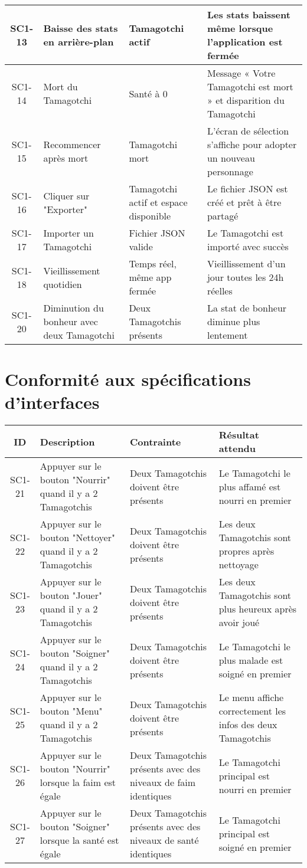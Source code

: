 \documentclass{cahier_de_recette}
\begin{document}
\begin{longtable}{|c|p{4cm}|p{4cm}|p{4cm}|}
\hline
SC1-13 & Baisse des stats en arrière-plan & Tamagotchi actif & Les stats baissent même lorsque l'application est fermée \\
\hline
SC1-14 & Mort du Tamagotchi & Santé à 0 & Message « Votre Tamagotchi est mort » et disparition du Tamagotchi \\
\hline
SC1-15 & Recommencer après mort & Tamagotchi mort & L’écran de sélection s’affiche pour adopter un nouveau personnage \\
\hline
SC1-16 & Cliquer sur "Exporter" & Tamagotchi actif et espace disponible & Le fichier JSON est créé et prêt à être partagé \\
\hline
SC1-17 & Importer un Tamagotchi & Fichier JSON valide & Le Tamagotchi est importé avec succès \\
\hline
SC1-18 & Vieillissement quotidien & Temps réel, même app fermée & Vieillissement d'un jour toutes les 24h réelles \\
\hline
SC1-20 & Diminution du bonheur avec deux Tamagotchi & Deux Tamagotchis présents & La stat de bonheur diminue plus lentement \\
\hline
\end{longtable}
\newpage
\section{Conformité aux spécifications d’interfaces}

\begin{longtable}{|c|p{4cm}|p{4cm}|p{4cm}|}
\hline
\textbf{ID} & \textbf{Description} & \textbf{Contrainte} & \textbf{Résultat attendu} \\
\hline
SC1-21 & Appuyer sur le bouton "Nourrir" quand il y a 2 Tamagotchis & Deux Tamagotchis doivent être présents & Le Tamagotchi le plus affamé est nourri en premier \\
\hline
SC1-22 & Appuyer sur le bouton "Nettoyer" quand il y a 2 Tamagotchis & Deux Tamagotchis doivent être présents & Les deux Tamagotchis sont propres après nettoyage \\
\hline
SC1-23 & Appuyer sur le bouton "Jouer" quand il y a 2 Tamagotchis & Deux Tamagotchis doivent être présents & Les deux Tamagotchis sont plus heureux après avoir joué \\
\hline
SC1-24 & Appuyer sur le bouton "Soigner" quand il y a 2 Tamagotchis & Deux Tamagotchis doivent être présents & Le Tamagotchi le plus malade est soigné en premier \\
\hline
SC1-25 & Appuyer sur le bouton "Menu" quand il y a 2 Tamagotchis & Deux Tamagotchis doivent être présents & Le menu affiche correctement les infos des deux Tamagotchis \\
\hline
SC1-26 & Appuyer sur le bouton "Nourrir" lorsque la faim est égale & Deux Tamagotchis présents avec des niveaux de faim identiques & Le Tamagotchi principal est nourri en premier \\
\hline
SC1-27 & Appuyer sur le bouton "Soigner" lorsque la santé est égale & Deux Tamagotchis présents avec des niveaux de santé identiques & Le Tamagotchi principal est soigné en premier \\
\hline
\end{longtable}
\end{document}
